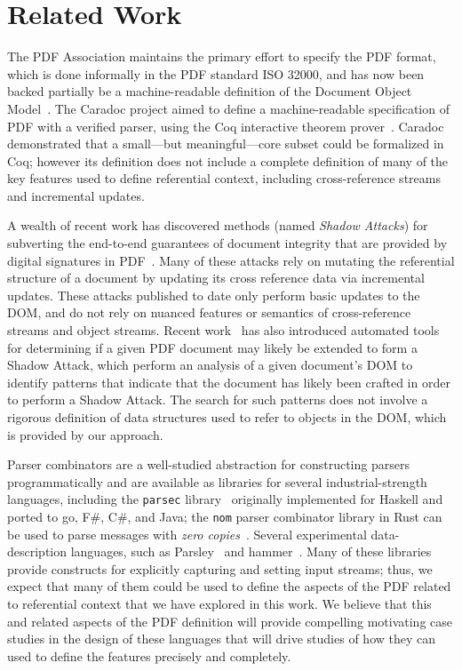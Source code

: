 \section{Related Work}
\label{sec:rel-work}

The PDF Association maintains the primary effort to specify the PDF
format, which is done informally in the PDF standard ISO 32000, and has now
been backed partially be a machine-readable definition of the Document
Object Model~\cite{peterwyattArlingtonPDFModel2021}.
%
The Caradoc project aimed to define a machine-readable specification
of PDF with a verified parser, using the Coq interactive theorem
prover~\cite{g.endignouxCaradocPragmaticApproach2016}.
%
Caradoc demonstrated that a small---but meaningful---core subset could
be formalized in Coq;
%
however its definition does not include a complete definition of many
of the key features used to define referential context, including
cross-reference streams and incremental updates.

A wealth of recent work has discovered methods (named \emph{Shadow
Attacks}) for subverting the end-to-end guarantees of document
integrity that are provided by digital signatures in
PDF~\cite{mullerPracticalDecryptionExFiltration2019,mladenovTrillionDollarRefund2019,mullerProcessingDangerousPaths2021,ndsssymposiumNDSS2021Shadow2021,rohlmannBreakingSpecificationPDF2021}.
%
Many of these attacks rely on mutating the referential structure of a
document by updating its cross reference data via incremental
updates.
%
These attacks published to date only perform basic
updates to the DOM, and do not rely on nuanced features or semantics
of cross-reference streams and object streams.
%
Recent work~\cite{itextShadowAttack} has also introduced automated
tools for determining if a given PDF document may likely be extended
to form a Shadow Attack, which perform an analysis of a given
document's DOM to identify patterns that indicate that the document
has likely been crafted in order to perform a Shadow Attack.
%
The search for such patterns does not involve a rigorous definition of
data structures used to refer to objects in the DOM, which is provided
by our approach.

Parser combinators are a well-studied abstraction for constructing
parsers programmatically and are available as libraries for several
industrial-strength languages, including the \texttt{parsec}
library~\cite{leijen2001parsec} originally implemented for Haskell and
ported to go, F\#, C\#, and Java;
%
the \texttt{nom} parser combinator library in Rust can be used to
parse messages with \emph{zero copies}~\cite{couprie2015nom}.
%
Several experimental data-description languages, such as
Parsley~\cite{mundkurResearchReportParsley2020} and
hammer~\cite{bratus2017curing}.
%
Many of these libraries provide constructs for explicitly capturing
and setting input streams;
%
thus, we expect that many of them could be used to define the aspects
of the PDF related to referential context that we have explored in
this work.
%
We believe that this and related aspects of the PDF definition will
provide compelling motivating case studies in the design of these
languages that will drive studies of how they can used to define the
features precisely and completely.
